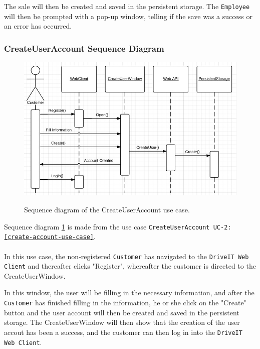The sale will then be created and saved in the persistent storage. The \texttt{Employee} will then be prompted with a pop-up window, telling if the save was a success or an error has occurred.

\subsubsection{CreateUserAccount Sequence Diagram}
\begin{figure}[H]
	\centering
		\includegraphics[width=\textwidth]{Figures/SequenceDiagram-CreateUserAccount}\\
	\caption{Sequence diagram of the CreateUserAccount use case.}
  \label{fig:SequenceDiagram-CreateUserAccount}
\end{figure}

Sequence diagram \ref{fig:SequenceDiagram-CreateUserAccount} is made from the use case \texttt{CreateUserAccount UC-2: \ref{create-account-use-case}}. \\\\
In this use case, the non-registered \texttt{Customer} has navigated to the \texttt{DriveIT Web Client} and thereafter clicks "Register", whereafter the customer is directed to the CreateUserWindow. 

In this window, the user will be filling in the necessary information, and after the \texttt{Customer} has finished filling in the information, he or she click on the "Create" button and the user account will then be created and saved in the persistent storage. The CreateUserWindow will then show that the creation of the user accout has been a success, and the customer can then log in into the \texttt{DriveIT Web Client}.

